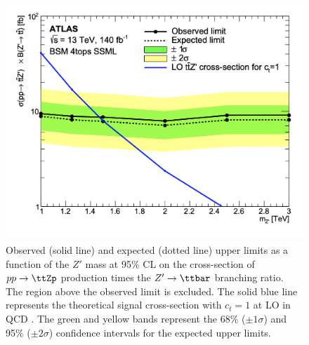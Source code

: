 \documentclass[../thesis.tex]{subfiles}
\begin{document}
\begin{figure}[!htb]
\centering
\includegraphics[width=0.8\linewidth]{fig/SRunblinded/ttZp_limits_fb.png}
\caption[Observed (solid line) and expected (dotted line) upper limits as a function of the $Z'$ mass at 95\% \acs{CL} on the cross-section of $pp\rightarrow\ttZp$ production times the $Z'\rightarrow\ttbar$ branching ratio. The region above the observed limit is excluded. The solid blue line represents the theoretical signal cross-section with $c_t=1$ at \acs{LO} in \acs{QCD}. The green and yellow bands represent the 68\% ($\pm\sigma$) and 95\% ($\pm 2\sigma$) confidence intervals respectively.]{\label{fig:results:ttZp_limits}Observed (solid line) and expected (dotted line) upper limits as a function of the $Z'$ mass at 95\% \acs{CL} on the cross-section of $pp\rightarrow\ttZp$ production times the $Z'\rightarrow\ttbar$ branching ratio. The region above the observed limit is excluded. The solid blue line represents the theoretical signal cross-section with $c_t=1$ at \acs{LO} in \acs{QCD} \citep{theory:ttZp_LHC}. The green and yellow bands represent the 68\% ($\pm 1\sigma$) and 95\% ($\pm 2\sigma$) confidence intervals for the expected upper limits.}
\end{figure}
\end{document}
